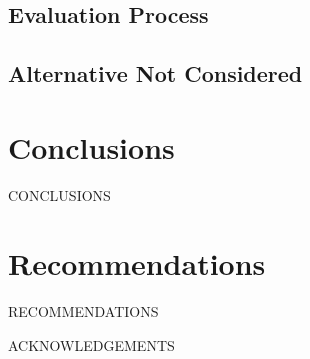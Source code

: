 \documentclass[12pt]{article}
\begin{document}
\subsection{Evaluation Process}
\subsection{Alternative Not Considered}

\section{Conclusions}
CONCLUSIONS


\section{Recommendations}
RECOMMENDATIONS


\newpage



\newpage


ACKNOWLEDGEMENTS
\newpage


\end{document}
